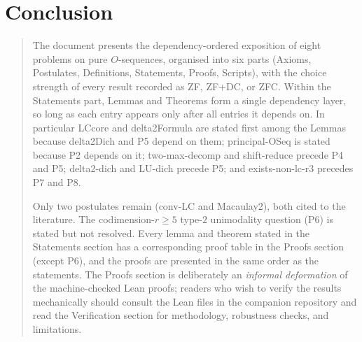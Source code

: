 \documentclass[11pt,reqno]{amsart}
\begin{document}
\section{Conclusion}

\begin{quotation}
\noindent 
\noindent%
The document presents the dependency-ordered exposition of eight problems on
pure $O$-sequences, organised into six parts (Axioms, Postulates,
Definitions, Statements, Proofs, Scripts), with the choice strength of every
result recorded as \textsf{ZF}, \textsf{ZF+DC}, or \textsf{ZFC}. Within the
Statements part, Lemmas and Theorems form a single dependency layer, so long
as each entry appears only after all entries it depends on. In particular 
\textsf{LCcore} and \textsf{delta2Formula} are stated first among the Lemmas
because \textsf{delta2Dich} and \textsf{P5} depend on them; \textsf{%
principal-OSeq} is stated because P2 depends on it; \textsf{two-max-decomp}
and \textsf{shift-reduce} precede P4 and P5; \textsf{delta2-dich} and 
\textsf{LU-dich} precede P5; and \textsf{exists-non-lc-r3} precedes P7 and
P8.

Only two postulates remain (\textsf{conv-LC} and \textsf{Macaulay2}), both
cited to the literature. The codimension-$r\geq 5$ type-$2$ unimodality
question (P6) is stated but not resolved. Every lemma and theorem stated in
the Statements section has a corresponding proof table in the Proofs section
(except P6), and the proofs are presented in the same order as the
statements. The Proofs section is deliberately an \emph{informal deformation}
of the machine-checked Lean proofs; readers who wish to verify the results
mechanically should consult the Lean files in the companion repository and
read the Verification section for methodology, robustness checks, and
limitations.
\end{quotation}
\end{document}
